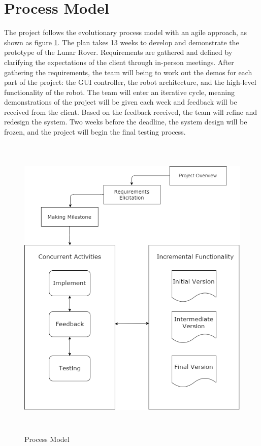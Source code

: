 \documentclass[12pt,a4paper]{article}
\begin{document}
	\section{Process Model}
	The project follows the evolutionary process model with an agile approach, as shown as figure \ref{modelDiagram}. The plan takes 13 weeks to develop and demonstrate the prototype of the Lunar Rover.  Requirements are gathered and defined by clarifying the expectations of the client through in-person meetings.  After gathering the requirements, the team will being to work out the demos for each part of the project: the GUI controller, the robot architecture, and the high-level functionality of the robot.  The team will enter an iterative cycle, meaning demonstrations of the project will be given each week and feedback will be received from the client.  Based on the feedback received, the team will refine and redesign the system.  Two weeks before the deadline, the system design will be frozen, and the project will begin the final testing process.
    \\
    \begin{figure}[htp!]
    	\centering
    	\includegraphics[width = 13cm, height = 15cm]{SPMP.png}
    	\caption{Process Model}
        \label{modelDiagram}
    \end{figure}
    
\end{document}

